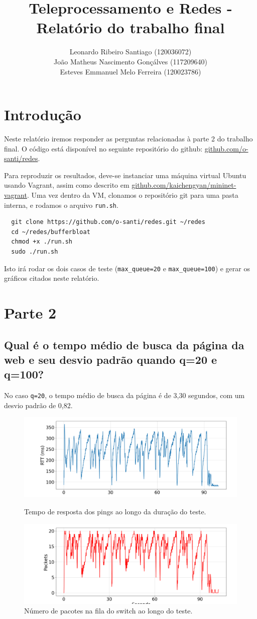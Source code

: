 \documentclass[a4paper,12pt]{article}
\title{Teleprocessamento e Redes - Relatório do trabalho final}
\author{
  Leonardo Ribeiro Santiago (120036072) \\
  João Matheus Nascimento Gonçálves (117209640) \\
  Esteves Emmanuel Melo Ferreira (120023786) }
\date{}
\newcommand{\code}[1]{\texttt{#1}}
\begin{document}
\maketitle

\section{Introdução}

Neste relatório iremos responder as perguntas relacionadas à parte 2 do trabalho final. O código está disponível no seguinte repositório do github: {\color{blue} \href{https://github.com/o-santi/redes}{github.com/o-santi/redes}}.

Para reproduzir os resultados, deve-se instanciar uma máquina virtual Ubuntu usando Vagrant, assim como descrito em {\color{blue} \href{https://github.com/kaichengyan/mininet-vagrant}{github.com/kaichengyan/mininet-vagrant}}. Uma vez dentro da VM, clonamos o repositório git para uma pasta interna, e rodamos o arquivo \code{run.sh}.
\begin{verbatim}
  git clone https://github.com/o-santi/redes.git ~/redes
  cd ~/redes/bufferbloat
  chmod +x ./run.sh
  sudo ./run.sh
\end{verbatim}

Isto irá rodar os dois casos de teste (\code{max\_queue=20} e \code{max\_queue=100}) e gerar os gráficos citados neste relatório.

\section{Parte 2}

\subsection{Qual é o tempo médio de busca da página da web e seu desvio padrão quando q=20 e q=100?}

No caso \code{q=20}, o tempo médio de busca da página é de 3,30 segundos, com um desvio padrão de 0,82.
\begin{figure}[h!]
  \centering
  \includegraphics[width=0.5\columnwidth]{./bufferbloat/reno-rtt-q20.png}
  \caption{Tempo de resposta dos pings ao longo da duração do teste.}
  \includegraphics[width=0.5\columnwidth]{./bufferbloat/reno-buffer-q20.png}
  \caption{Número de pacotes na fila do switch ao longo do teste.}
\end{figure}
\end{document}
